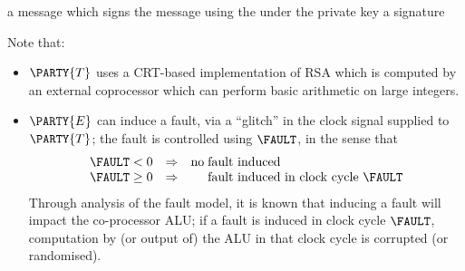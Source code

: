 %



{a message}
{which signs the message using the under the private key}
{a signature}




%
Note that:

\begin{itemize}
\item $\PARTY{T}$ uses a CRT-based implementation of RSA which is computed by
an external coprocessor which can perform basic arithmetic on large integers.

\item $\PARTY{E}$
      can induce a fault, via a ``glitch'' in the clock signal supplied to
      $\PARTY{T}$;
      the fault is controlled using $\FAULT$, in the sense that
      \[
      \begin{array}{c@{\;}c@{\;}c c c@{\;}l}
      \FAULT &<   & 0 &\Rightarrow& \mbox{no} & \mbox{fault induced                        } \\
      \FAULT &\geq& 0 &\Rightarrow&           & \mbox{fault induced in clock cycle $\FAULT$} \\
      \end{array}
      \]
      Through analysis of the fault model, it is known that inducing a fault 
      will impact the co-processor ALU; if a fault is induced in clock cycle
      $\FAULT$, computation by (or output of) the ALU in that clock cycle is
      corrupted (or randomised).
\end{itemize}

